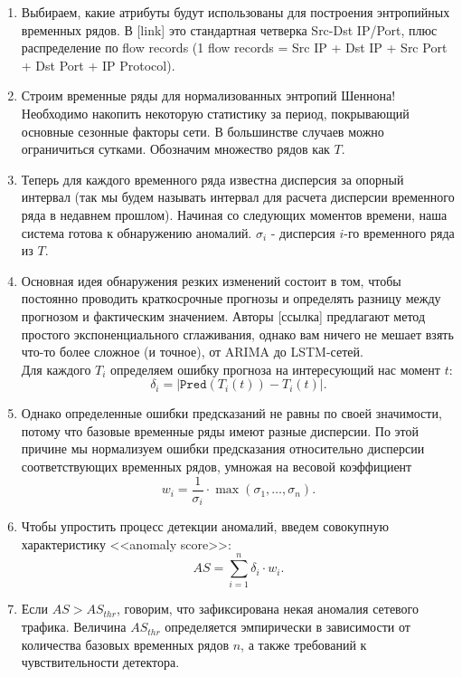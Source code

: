 \documentclass[]{interact}
\theoremstyle{plain}%
\theoremstyle{definition}
\theoremstyle{remark}
\begin{document}
\begin{enumerate}
    \item Выбираем, какие атрибуты будут использованы для построения энтропийных временных рядов. В [link] это стандартная четверка Src-Dst IP/Port, плюс распределение по flow records (1 flow records = Src IP + Dst IP + Src Port + Dst Port + IP Protocol).
    \item Строим временные ряды для нормализованных энтропий Шеннона! Необходимо накопить некоторую статистику за период, покрывающий основные сезонные факторы сети. В большинстве случаев можно ограничиться сутками. Обозначим множество рядов как $T$.
    \item Теперь для каждого временного ряда известна дисперсия за опорный интервал (так мы будем называть интервал для расчета дисперсии временного ряда в недавнем прошлом). Начиная со следующих моментов времени, наша система готова к обнаружению аномалий. $\sigma_i$ - дисперсия $i$-го временного ряда из $T$.
    \item Основная идея обнаружения резких изменений состоит в том, чтобы постоянно проводить краткосрочные прогнозы и определять разницу между прогнозом и фактическим значением. Авторы [ссылка] предлагают метод простого экспоненциального сглаживания, однако вам ничего не мешает взять что-то более сложное (и точное), от ARIMA до LSTM-сетей. \\
    Для каждого $T_i$ определяем ошибку прогноза на интересующий нас момент $t$:
    \begin{equation}
        \delta_i = | \texttt{Pred}(T_i(t)) - T_i(t) |.
    \end{equation}
    \item Однако определенные ошибки предсказаний не равны по своей значимости, потому что базовые временные ряды имеют разные дисперсии. По этой причине мы нормализуем ошибки предсказания относительно дисперсии соответствующих временных рядов, умножая на весовой коэффициент
    \begin{equation}
        w_i = \frac{1}{\sigma_i} \cdot \max (\sigma_1, \ldots, \sigma_n).
    \end{equation}
    \item Чтобы упростить процесс детекции аномалий, введем совокупную характеристику <<anomaly score>>:
    \begin{equation}
        AS = \sum_{i=1}^n \delta_i \cdot w_i.
    \end{equation}
    \item Если $AS > AS_{thr}$, говорим, что зафиксирована некая аномалия сетевого трафика. Величина $AS_{thr}$ определяется эмпирически в зависимости от количества базовых временных рядов $n$, а также требований к чувствительности детектора.

\end{enumerate}
\end{document}
